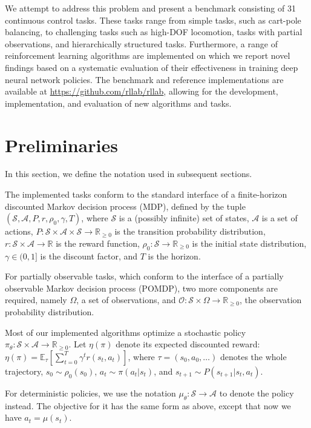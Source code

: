 \documentclass{article}
\newcommand{\cS}{\mathcal{S}}
\newcommand{\cO}{\mathcal{O}}
\newcommand{\cA}{\mathcal{A}}
\newcommand{\bR}{\mathbb{R}}
\newcommand{\bE}{\mathbb{E}}
\begin{document}
We attempt to address this problem and present a benchmark consisting of 31 continuous control tasks. These tasks range from simple tasks, such as cart-pole balancing, to challenging tasks such as high-DOF locomotion, tasks with partial observations, and hierarchically structured tasks. Furthermore, a range of reinforcement learning algorithms are implemented on which we report novel findings based on a systematic evaluation of their effectiveness in training deep neural network policies. The benchmark and reference implementations are available at \url{https://github.com/rllab/rllab}, allowing for the development, implementation, and evaluation of new algorithms and tasks. 



\section{Preliminaries}
\label{section:preliminaries}

In this section, we define the notation used in subsequent sections.

The implemented tasks conform to the standard interface of a finite-horizon discounted Markov decision process (MDP), defined by the tuple $(\cS, \cA, P, r, \rho_0, \gamma, T)$, where $\cS$ is a (possibly infinite) set of states, $\cA$ is a set of actions, $P: \cS \times \cA \times \cS \rightarrow \bR_{\geq 0}$ is the transition probability distribution, $r: \cS \times \cA \rightarrow \bR$  is the reward function, $\rho_0: \cS \to \bR_{\geq 0}$ is the initial state distribution, $\gamma \in (0, 1]$ is the discount factor, and $T$ is the horizon.

For partially observable tasks, which conform to the interface of a partially observable Markov decision process (POMDP), two more components are required, namely $\Omega$, a set of observations, and $\cO: \cS \times \Omega \to \bR_{\geq 0}$, the observation probability distribution.

Most of our implemented algorithms optimize a stochastic policy $\pi_\theta: \cS \times \cA \rightarrow \bR_{\geq 0}$. Let $\eta(\pi)$ denote its expected discounted reward: 
$ \eta(\pi) = \bE_{\tau}\left[ \sum_{t=0}^T \gamma^t r(s_t, a_t) \right]$, where $\tau = (s_0, a_0, \ldots)$ denotes the whole trajectory, $\displaystyle s_0 \sim \rho_0(s_0)$, $a_t \sim \pi(a_t|s_t)$, and $s_{t+1} \sim P(s_{t+1} | s_t, a_t)$.

For deterministic policies, we use the notation $\mu_\theta: \cS \rightarrow \cA$ to denote the policy instead. The objective for it has the same form as above, except that now we have $a_t = \mu(s_t)$.
\end{document}
